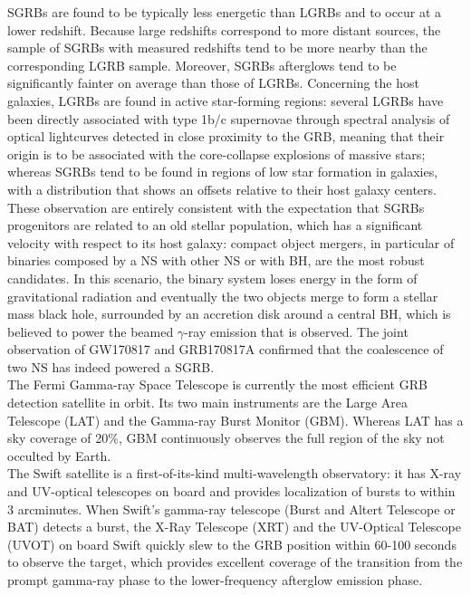 \documentclass[binding=0.6cm, LaM]{sapthesis}
\begin{document}
        SGRBs are found to be typically less energetic than LGRBs and to occur at a lower redshift.
        Because large redshifts correspond to more distant sources,
        the sample of SGRBs with measured redshifts tend to be more nearby than the corresponding LGRB sample.
        Moreover, SGRBs afterglows tend to be significantly fainter on average than those of LGRBs.
        Concerning the host galaxies, LGRBs are found in active star-forming regions:
	 several LGRBs have been directly associated with type 1b/c supernovae
        through spectral analysis of optical lightcurves detected in close proximity to the GRB,
        meaning that their origin is to be associated with the core-collapse explosions of massive stars;
        whereas SGRBs tend to be found in regions of low star formation in galaxies,
        with a distribution that shows an offsets relative to their host galaxy centers.
        These observation are entirely consistent with the expectation that SGRBs progenitors
        are related to an old stellar population, which has a significant velocity with respect to its host galaxy:
        compact object mergers, in particular of binaries composed by a NS with other NS or with BH, are the most robust candidates.
        In this scenario, the binary system loses energy in the form of gravitational radiation and eventually the two objects
        merge to form a stellar mass black hole, surrounded by an accretion disk around a central BH, which is believed to power the beamed $\gamma$-ray emission that is observed.
        The joint observation of GW170817 and GRB170817A confirmed that the coalescence of two NS has indeed powered a SGRB. \\
        The Fermi Gamma-ray Space Telescope is currently the most efficient GRB detection satellite in orbit.
        Its two main instruments are the Large Area Telescope (LAT) and the Gamma-ray Burst Monitor (GBM).
        Whereas LAT has a sky coverage of 20\%, GBM continuously observes the full region of the sky not occulted by Earth. \\
        The Swift satellite is a first-of-its-kind multi-wavelength observatory:
        it has X-ray and UV-optical telescopes on board and provides localization of bursts to within 3 arcminutes.
        When Swift’s gamma-ray telescope (Burst and Altert Telescope or BAT) detects a burst,
        the X-Ray Telescope (XRT) and the UV-Optical Telescope (UVOT) on board Swift quickly slew to the
        GRB position within 60-100 seconds to observe the target, which provides excellent coverage
        of the transition from the prompt gamma-ray phase to the lower-frequency afterglow emission phase.
\end{document}
